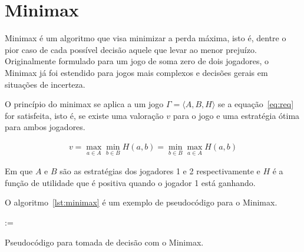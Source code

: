 \chapter{Minimax}\label{cap:minimax}

Minimax é um algoritmo que visa minimizar a perda máxima, isto é, dentre
o pior caso de cada possível decisão aquele que levar ao menor prejuízo.
Originalmente formulado para um jogo de soma zero de dois jogadores, o Minimax
já foi estendido para jogos mais complexos e decisões gerais em situações de
incerteza.

O princípio do minimax se aplica a um jogo $\Gamma=\langle A,B,H\rangle$ se a
equação~\ref{eq:req} for satisfeita, isto é, se existe uma valoração $v$ para o
jogo e uma estratégia ótima para ambos jogadores.
\cite{hazewinkel2002encyclopaedia}

\begin{gather}
  v=\max_{a\in A}\min_{b\in B}H(a,b)=\min_{b\in B}\max_{a\in A}H(a,b)\label{eq:req}
\end{gather}

Em que $A$ e $B$ são as estratégias dos jogadores 1 e 2 respectivamente e $H$ é a
função de utilidade que é positiva quando o jogador 1 está ganhando.


O algoritmo~\ref{lst:minimax} é um exemplo de pseudocódigo para o Minimax.

\begin{algorithm}


   := 

  \;

  \caption{Pseudocódigo para tomada de decisão com o Minimax.}\label{lst:minimax}
\end{algorithm}


